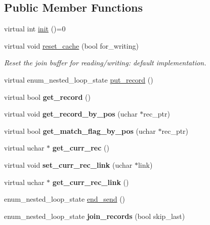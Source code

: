 \subsection*{Public Member Functions}
\begin{DoxyCompactItemize}
\item 
virtual int \mbox{\hyperlink{classJOIN__CACHE_a1dcdce348bba725c675b327eb90aa924}{init}} ()=0
\item 
virtual void \mbox{\hyperlink{group__Query__Optimizer_gad54e309ac7f0fd377d7a422ea54f59f8}{reset\+\_\+cache}} (bool for\+\_\+writing)
\begin{DoxyCompactList}\small\item\em Reset the join buffer for reading/writing\+: default implementation. \end{DoxyCompactList}\item 
virtual enum\+\_\+nested\+\_\+loop\+\_\+state \mbox{\hyperlink{classJOIN__CACHE_a28c138049387c559d0ea74d7a6fbcfc0}{put\+\_\+record}} ()
\item 
virtual bool {\bfseries get\+\_\+record} ()
\item 
virtual void {\bfseries get\+\_\+record\+\_\+by\+\_\+pos} (uchar $\ast$rec\+\_\+ptr)
\item 
virtual bool {\bfseries get\+\_\+match\+\_\+flag\+\_\+by\+\_\+pos} (uchar $\ast$rec\+\_\+ptr)
\item 
\mbox{\label{classJOIN__CACHE_a5c5a1f4ae6134f06ed6ee9ee922118c1}} 
virtual uchar $\ast$ {\bfseries get\+\_\+curr\+\_\+rec} ()
\item 
\mbox{\label{classJOIN__CACHE_a3fe84e0beb101c5168a0d3423782f7e3}} 
virtual void {\bfseries set\+\_\+curr\+\_\+rec\+\_\+link} (uchar $\ast$link)
\item 
\mbox{\label{classJOIN__CACHE_af7a91c82224827b7207ac1a991d93814}} 
virtual uchar $\ast$ {\bfseries get\+\_\+curr\+\_\+rec\+\_\+link} ()
\item 
enum\+\_\+nested\+\_\+loop\+\_\+state \mbox{\hyperlink{classJOIN__CACHE_a1c3046624063d752fe21c895e13a00c9}{end\+\_\+send}} ()
\item 
enum\+\_\+nested\+\_\+loop\+\_\+state {\bfseries join\+\_\+records} (bool skip\+\_\+last)
\item 
\mbox{\label{classJOIN__CACHE_acfa83799aab763263f9d11acb4078a1b}} 

\end{DoxyCompactItemize}
